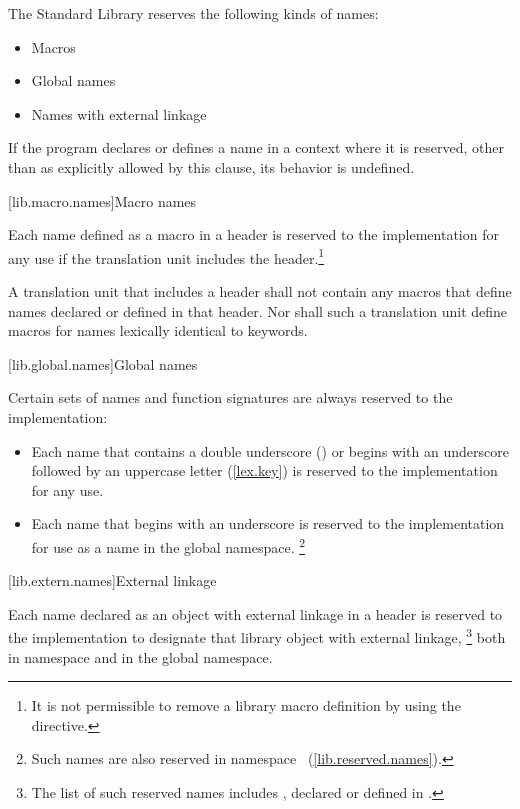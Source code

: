 \pnum
The \Cpp Standard Library reserves the following kinds of names:
\begin{itemize}
\item Macros
\item Global names
\item Names with external linkage
\end{itemize}

\pnum
If the program declares or defines a name in a context where it is
reserved, other than as explicitly allowed by this clause, its behavior is
undefined.%

[lib.macro.names]{Macro names}

\pnum
{}%
%
Each name defined as a macro in a header is reserved to the implementation
for any use if the translation unit includes the header.\footnote{It is not
permissible to remove a library macro definition by using the 
directive.}

\pnum
{}%
A translation unit that includes a header shall not contain any macros that
define names declared or defined in that header. Nor shall such a translation
unit define macros for names lexically identical to keywords.

[lib.global.names]{Global names}

\pnum
Certain sets of names and function signatures are always reserved to the implementation:

\begin{itemize}
\item
Each name that contains a double underscore
(\tcode{\unun})
%
or begins with an underscore followed by
an uppercase letter
%
(\ref{lex.key}) is reserved to the implementation for any use.
\item
Each name that begins with an underscore is
%
reserved to the implementation for use as a name in the global namespace.%
\footnote{Such names are also reserved in namespace
~(\ref{lib.reserved.names}).}
\end{itemize}

[lib.extern.names]{External linkage}

\pnum
Each name declared as an object with external linkage
%
in a header is reserved to the implementation to designate that library
object with external linkage,%
\footnote{The list of such reserved names includes
,
declared or defined in
%
%
.}
both in namespace
and in the global namespace.

